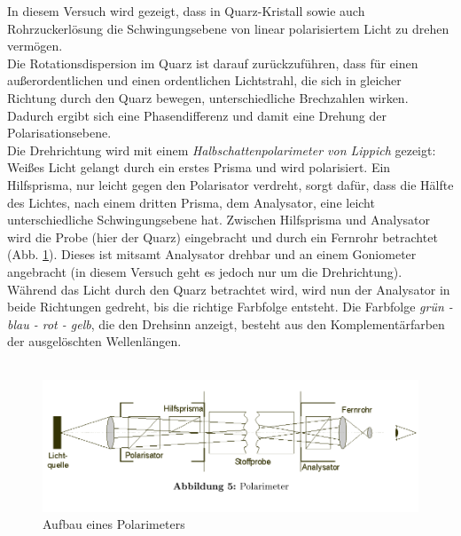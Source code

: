 \documentclass[12pt,a4paper]{article}
\begin{document}
\begin{multicols}{2}
In diesem Versuch wird gezeigt, dass in Quarz-Kristall sowie auch Rohrzuckerlösung die Schwingungsebene von linear polarisiertem Licht zu drehen vermögen.\\
Die Rotationsdispersion im Quarz ist darauf zurückzuführen, dass für einen außerordentlichen und einen ordentlichen Lichtstrahl, die sich in gleicher Richtung durch den Quarz bewegen, unterschiedliche Brechzahlen wirken. Dadurch ergibt sich eine Phasendifferenz und damit eine Drehung der Polarisationsebene.\\
Die Drehrichtung wird mit einem \emph{Halbschattenpolarimeter von Lippich} gezeigt: Weißes Licht gelangt durch ein erstes Prisma und wird polarisiert. Ein Hilfsprisma, nur leicht gegen den Polarisator verdreht, sorgt dafür, dass die Hälfte des Lichtes, nach einem dritten Prisma, dem Analysator, eine leicht unterschiedliche Schwingungsebene hat. Zwischen Hilfsprisma und Analysator wird die Probe (hier der Quarz) eingebracht und durch ein Fernrohr betrachtet (Abb. \ref{fig:polarimeter}). Dieses ist mitsamt Analysator drehbar und an einem Goniometer angebracht (in diesem Versuch geht es jedoch nur um die Drehrichtung).\\
Während das Licht durch den Quarz betrachtet wird, wird nun der Analysator in beide Richtungen gedreht, bis die richtige Farbfolge entsteht. Die Farbfolge \emph{grün - blau - rot - gelb}, die den Drehsinn anzeigt, besteht aus den Komplementärfarben der ausgelöschten Wellenlängen.\\
\\
\begin{figure}[H]
	\centering
	\includegraphics[scale=0.5]{./data/rotationsdispersion.png}
	\caption{Aufbau eines Polarimeters}
	\label{fig:polarimeter}
\end{figure}



\end{multicols}
\end{document}
